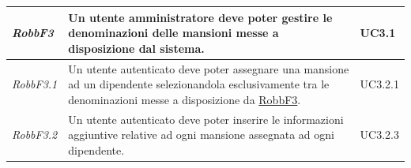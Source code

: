 \begin{flushleft}
\begin{tabular}{|l{2cm}|l{8cm}|l{2cm}|}
	\hline
	\label{RobbF3}
	\textit{RobbF3} & Un utente amministratore deve poter gestire le denominazioni delle mansioni messe a disposizione dal sistema. & UC3.1\\
	\hline
	\label{RobbF3.1}
	\textit{RobbF3.1} & Un utente autenticato deve poter assegnare una mansione ad un dipendente selezionandola esclusivamente tra le denominazioni messe a disposizione da \hyperref[RobbF3]{RobbF3}. & UC3.2.1 \\
	\hline
	\label{RobbF3.2}
	\textit{RobbF3.2} & Un utente autenticato deve poter inserire le informazioni aggiuntive relative ad ogni mansione assegnata ad ogni dipendente. & UC3.2.3\\
	\hline
\end{tabular}
\end{flushleft}
	\newpage
	
